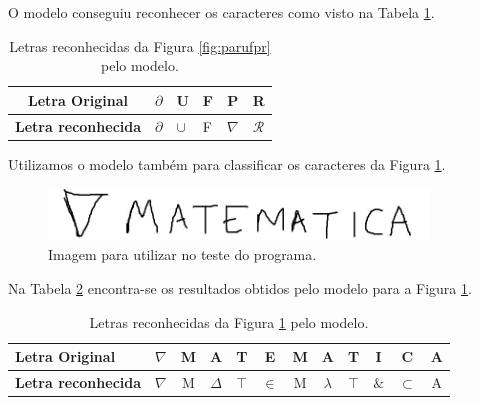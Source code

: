 \documentclass[
	12pt,				%
    oneside,			%
	a4paper,			%
	english,			%
	french,				%
	spanish,			%
	brazil,				%
	]{abntex2}
\begin{document}
        O modelo conseguiu reconhecer os caracteres como visto na Tabela \ref{tab:parufpr}.

        \begin{table}[htb]
            \centering
            \caption{Letras reconhecidas da Figura \ref{fig:parufpr} pelo modelo.}
            \label{tab:parufpr}
            \begin{tabular}{@{}clllll@{}}
                \toprule
                \textbf{Letra Original}    & \multicolumn{1}{c}{$\partial$} & \multicolumn{1}{c}{U} &     \multicolumn{1}{c}{F} & \multicolumn{1}{c}{P} & \multicolumn{1}{c}{R} \\ \midrule
                \textbf{Letra reconhecida} & $\partial$                     & $\cup$                & F                     & $\nabla$              & $\mathcal{R}$         \\ \bottomrule
            \end{tabular}
        \end{table}



        Utilizamos o modelo também para classificar os caracteres da Figura \ref{fig:nabmat}.
        \begin{figure}[htb]
            \centering
            \includegraphics[width=0.9\textwidth]{TesteMat.png}
            \caption{Imagem para utilizar no teste do programa.}
            \label{fig:nabmat}
        \end{figure}
        Na Tabela \ref{tab:nabmat} encontra-se os resultados obtidos pelo modelo para a Figura \ref{fig:nabmat}.

        \begin{table}[htb]
            \centering
            \caption{Letras reconhecidas da Figura \ref{fig:nabmat} pelo modelo.}
            \label{tab:nabmat}
            \begin{tabular}{@{}lccccccccccc@{}}
                \toprule
                \textbf{Letra Original}    & $\nabla$ & M & A        & T      & E     & M & A         & T      & I    & C         & A \\ \midrule
                \textbf{Letra reconhecida} & $\nabla$ & M & $\Delta$ & $\top$ & $\in$ & M & $\lambda$ & $\top$ & $\&$ & $\subset$ & A \\ \bottomrule
            \end{tabular}
        \end{table}
\end{document}
